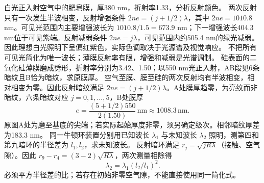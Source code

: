 \problemtext 白光正入射空气中的肥皂膜，厚380 nm，折射率1.33，分析反射颜色。
\workings 两次反射只有一次发生半波相变，反射增强条件 $2ne=(j+1/2)\lambda$，其中 $2ne=1010.8$ nm。可见光范围内主要增强波长为 $1010.8/1.5=673.9$ nm；下一增强波长404.3 nm位于可见紫端。反射减弱条件 $2ne=j\lambda$，可见范围内约505.4 nm的绿光减弱。因此理想白光照明下呈偏红紫色，实际色调取决于光源谱及视觉响应。
\crosscheck 不把所有可见光简化为唯一波长；薄膜反射率有限，增强和减弱是光谱调制。
\problemtext 硅表面的二氧化硅薄膜磨成劈形，折射率分别为3.42、1.50；以550 nm光正入射，AB段见6条暗纹且B恰为暗纹，求原膜厚。
\workings 空气至膜、膜至硅的两次反射均有半波相变，相对相变为零。因此反射暗纹满足 $2ne=(j+1/2)\lambda$。A处膜厚趋零，为亮纹而非暗纹，六条暗纹对应 $j=0,1,\ldots,5$，B处膜厚
\[
e=\frac{(5+1/2)550}{2(1.50)}\,\mathrm{nm}\approx1008.3\,\mathrm{nm}.
\]
\crosscheck 原图A处为磨至基底的尖端；若实际起始厚度非零，须另确定级次。相邻暗纹厚差为183.3 nm。
\problemtext 同一牛顿环装置分别用已知波长 $\lambda_1$ 与未知波长 $\lambda_2$ 照明，测第四和第九暗环的半径差为 $l_1,l_2$，求未知波长。
\workings 反射暗环满足 $r_j=\sqrt{jR\lambda}$（接触、空气隙）。因此 $r_9-r_4=(3-2)\sqrt{R\lambda}$，两次测量相除得
\[
\lambda_2=\lambda_1(l_2/l_1)^2.
\]
\crosscheck 必须平方半径差的比；若存在初始非零空气隙，不能直接使用同一简化式。
